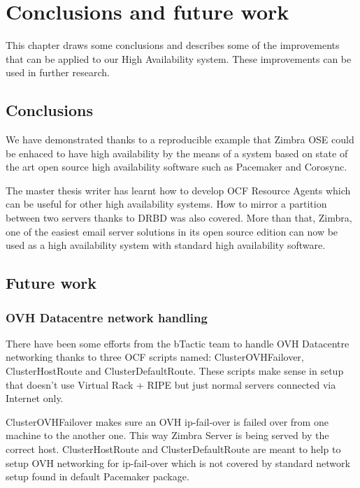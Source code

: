 

\chapter{Conclusions and future work}
\label{chap:conclusions-and-future-work}
This chapter draws some conclusions and describes some of the improvements that can be applied to our High Availability system. These improvements can be used in further research.

\section {Conclusions}

We have demonstrated thanks to a reproducible example that Zimbra OSE could be enhaced to have high availability by the means of a system based on state of the art open source high availability software such as Pacemaker and Corosync.

The master thesis writer has learnt how to develop OCF Resource Agents which can be useful for other high availability systems. How to mirror a partition between two servers thanks to DRBD was also covered. More than that, Zimbra, one of the easiest email server solutions in its open source edition can now be used as a high availability system with standard high availability software.

\section {Future work}

\subsection {OVH Datacentre network handling}
There have been some efforts from the bTactic team to handle OVH Datacentre networking thanks to three OCF scripts named: 
ClusterOVHFailover, ClusterHostRoute and ClusterDefaultRoute. These scripts make sense in setup that doesn't use Virtual Rack + RIPE but just normal servers connected via Internet only.

ClusterOVHFailover makes sure an OVH ip-fail-over is failed over from one machine to the another one. This way Zimbra Server is being served by the correct host.
ClusterHostRoute and ClusterDefaultRoute are meant to help to setup OVH networking for ip-fail-over which is not covered by standard network setup found in  default Pacemaker package.

